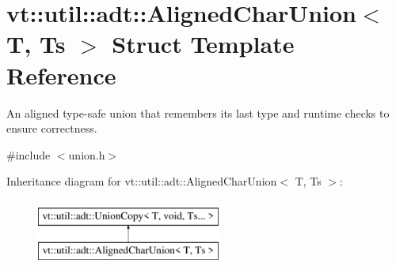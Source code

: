 \hypertarget{structvt_1_1util_1_1adt_1_1_aligned_char_union}{}\section{vt\+:\+:util\+:\+:adt\+:\+:Aligned\+Char\+Union$<$ T, Ts $>$ Struct Template Reference}
\label{structvt_1_1util_1_1adt_1_1_aligned_char_union}


An aligned type-\/safe union that remembers its last type and runtime checks to ensure correctness.  




{\ttfamily \#include $<$union.\+h$>$}

Inheritance diagram for vt\+:\+:util\+:\+:adt\+:\+:Aligned\+Char\+Union$<$ T, Ts $>$\+:\begin{figure}[H]
\begin{center}
\leavevmode
\includegraphics[height=2.000000cm]{structvt_1_1util_1_1adt_1_1_aligned_char_union}
\end{center}
\end{figure}
